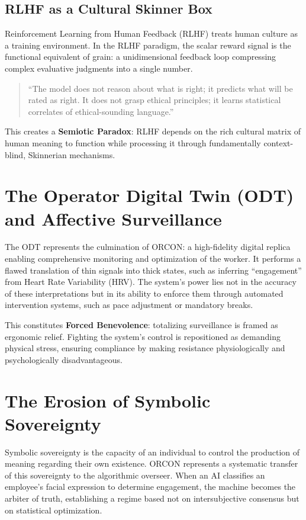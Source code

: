 \documentclass[11pt, a4paper]{article}
\begin{document}
\subsection{RLHF as a Cultural Skinner Box}
Reinforcement Learning from Human Feedback (RLHF) treats human culture as a training environment. In the RLHF paradigm, the scalar reward signal is the functional equivalent of grain: a unidimensional feedback loop compressing complex evaluative judgments into a single number. 
\begin{quote}
``The model does not reason about what is right; it predicts what will be rated as right. It does not grasp ethical principles; it learns statistical correlates of ethical-sounding language.''
\end{quote}
This creates a \textbf{Semiotic Paradox}: RLHF depends on the rich cultural matrix of human meaning to function while processing it through fundamentally context-blind, Skinnerian mechanisms.

\section{The Operator Digital Twin (ODT) and Affective Surveillance}

The ODT represents the culmination of ORCON: a high-fidelity digital replica enabling comprehensive monitoring and optimization of the worker. It performs a flawed translation of thin signals into thick states, such as inferring ``engagement'' from Heart Rate Variability (HRV). The system's power lies not in the accuracy of these interpretations but in its ability to enforce them through automated intervention systems, such as pace adjustment or mandatory breaks.

This constitutes \textbf{Forced Benevolence}: totalizing surveillance is framed as ergonomic relief. Fighting the system's control is repositioned as demanding physical stress, ensuring compliance by making resistance physiologically and psychologically disadvantageous.

\section{The Erosion of Symbolic Sovereignty}

Symbolic sovereignty is the capacity of an individual to control the production of meaning regarding their own existence. ORCON represents a systematic transfer of this sovereignty to the algorithmic overseer. When an AI classifies an employee's facial expression to determine engagement, the machine becomes the arbiter of truth, establishing a regime based not on intersubjective consensus but on statistical optimization.
\end{document}

